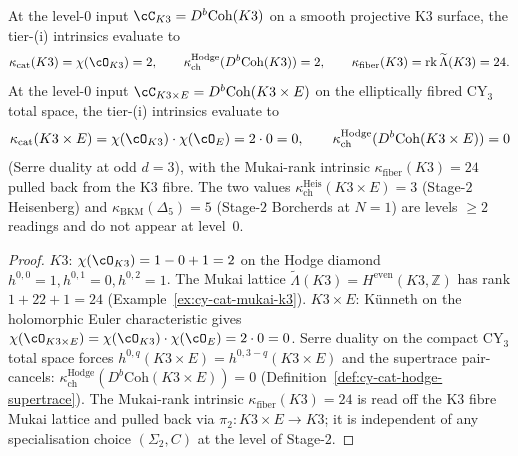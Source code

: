 \begin{proposition}
\label{prop:cy-cat-tier-i-k3xe}
At the level-$0$ input $\cC_{K3} = D^b\mathrm{Coh}(K3)$ on a smooth
projective K3 surface, the tier-(i) intrinsics evaluate to
\[
 \kappa_{\mathrm{cat}}(K3) = \chi(\cO_{K3}) = 2, \qquad
 \kappa_{\mathrm{ch}}^{\mathrm{Hodge}}(D^b\mathrm{Coh}(K3)) = 2, \qquad
 \kappa_{\mathrm{fiber}}(K3) = \mathrm{rk}\,\widetilde\Lambda(K3) = 24.
\]
At the level-$0$ input $\cC_{K3\times E} = D^b\mathrm{Coh}(K3\times E)$
on the elliptically fibred CY$_3$ total space, the tier-(i) intrinsics
evaluate to
\[
 \kappa_{\mathrm{cat}}(K3\times E) =
 \chi(\cO_{K3})\cdot\chi(\cO_E) = 2\cdot 0 = 0, \qquad
 \kappa_{\mathrm{ch}}^{\mathrm{Hodge}}(D^b\mathrm{Coh}(K3\times E)) = 0
\]
(Serre duality at odd $d = 3$), with the Mukai-rank intrinsic
$\kappa_{\mathrm{fiber}}(K3) = 24$ pulled back from the K3 fibre.
The two values $\kappa_{\mathrm{ch}}^{\mathrm{Heis}}(K3\times E) = 3$
(Stage-$2$ Heisenberg) and $\kappa_{\mathrm{BKM}}(\Delta_5) = 5$
(Stage-$2$ Borcherds at $N = 1$) are levels $\geq 2$ readings and do
not appear at level~$0$.
\end{proposition}

\begin{proof}
$K3$: $\chi(\cO_{K3}) = 1 - 0 + 1 = 2$ on the Hodge diamond
$h^{0,0} = 1, h^{0,1} = 0, h^{0,2} = 1$. The Mukai lattice
$\widetilde\Lambda(K3) = H^{\mathrm{even}}(K3, \mathbb Z)$ has rank
$1 + 22 + 1 = 24$ (Example~\ref{ex:cy-cat-mukai-k3}).
$K3 \times E$: K\"unneth on the holomorphic Euler characteristic
gives $\chi(\cO_{K3\times E}) = \chi(\cO_{K3})\cdot\chi(\cO_E) =
2\cdot 0 = 0$. Serre duality on the compact CY$_3$ total space
forces $h^{0, q}(K3 \times E) = h^{0, 3-q}(K3 \times E)$ and the
supertrace pair-cancels:
$\kappa_{\mathrm{ch}}^{\mathrm{Hodge}}(D^b\mathrm{Coh}(K3\times E))
= 0$ (Definition~\ref{def:cy-cat-hodge-supertrace}). The Mukai-rank
intrinsic $\kappa_{\mathrm{fiber}}(K3) = 24$ is read off the
K3 fibre Mukai lattice and pulled back via $\pi_2 \colon K3 \times E
\to K3$; it is independent of any specialisation choice
$(\Sigma_2, C)$ at the level of Stage-$2$.
\end{proof}

